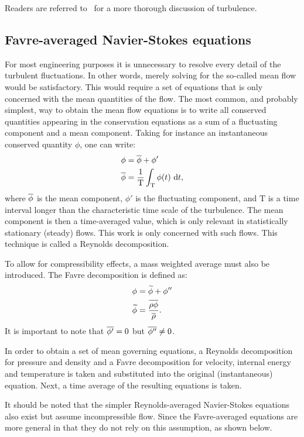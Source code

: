 Readers are referred to~\cite{pope2001turbulent,wilcox1998turbulence} for a more thorough discussion of turbulence.
%
\subsection{Favre-averaged Navier-Stokes equations}
%
For most engineering purposes it is unnecessary to resolve every detail of the turbulent fluctuations. In other words, merely solving for the so-called mean flow would be satisfactory. This would require a set of equations that is only concerned with the mean quantities of the flow. The most common, and probably simplest, way to obtain the mean flow equations is to write all conserved quantities appearing in the conservation equations as a sum of a fluctuating component and a mean component. Taking for instance an instantaneous conserved quantity $\phi$, one can write:
\begin{align*}
    \phi &= \overline{\phi} + \phi'\\
    \overline{\phi} &= \frac{1}{\text{T}} \int_{\text{T}}\phi(t)
        ~\text{d}t,
\end{align*}
where $\overline{\phi}$ is the mean component, $\phi'$ is the fluctuating component, and $\text{T}$ is a time interval longer than the characteristic time scale of the turbulence. The mean component is then a time-averaged value, which is only relevant in statistically stationary (steady) flows. This work is only concerned with such flows. This technique is called a Reynolds decomposition.

To allow for compressibility effects, a mass weighted average must also be introduced. The Favre decomposition is defined as:
\begin{align*}
    \phi &= \widetilde{\phi} + \phi'' \\
    \widetilde{\phi} &= \frac{\overline{\rho\phi}}{\overline{\rho}}.
\end{align*}
It is important to note that $\overline{\phi'} = 0$ but $\overline{\phi''} \ne 0$.

In order to obtain a set of mean governing equations, a Reynolds decomposition for pressure and density and a Favre decomposition for velocity, internal energy and temperature is taken and substituted into the original (instantaneous) equation. Next, a time average of the resulting equations is taken.

It should be noted that the simpler Reynolds-averaged Navier-Stokes equations also exist but assume incompressible flow. Since the Favre-averaged equations are more general in that they do not rely on this assumption, as shown below.
%
